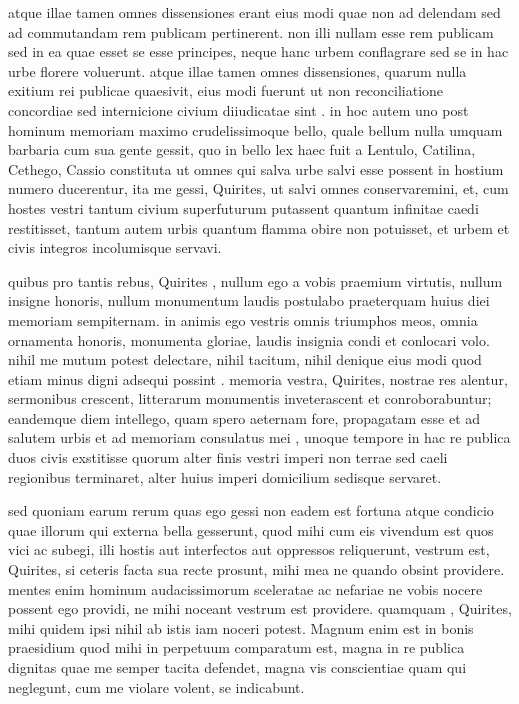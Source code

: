  atque illae tamen omnes dissensiones erant eius modi quae non ad delendam sed ad commutandam rem publicam pertinerent. non illi nullam esse rem publicam sed in ea quae esset se esse principes, neque hanc urbem conflagrare sed se in hac urbe florere voluerunt. atque illae tamen omnes dissensiones, quarum nulla exitium rei publicae quaesivit, eius modi fuerunt ut non reconciliatione concordiae sed internicione civium diiudicatae sint . in hoc autem uno post hominum memoriam maximo crudelissimoque bello, quale bellum nulla umquam barbaria cum sua gente gessit, quo in bello lex haec fuit a Lentulo, Catilina, Cethego, Cassio constituta ut omnes qui salva urbe salvi esse possent in hostium numero ducerentur, ita me gessi, Quirites, ut salvi omnes conservaremini, et, cum hostes vestri tantum civium superfuturum putassent quantum infinitae caedi restitisset, tantum autem urbis quantum flamma obire non potuisset, et urbem et civis integros incolumisque servavi.

 quibus pro tantis rebus, Quirites , nullum ego a vobis praemium virtutis, nullum insigne honoris, nullum monumentum laudis postulabo praeterquam huius diei memoriam sempiternam. in animis ego vestris omnis triumphos meos, omnia ornamenta honoris, monumenta gloriae, laudis insignia condi et conlocari volo. nihil me mutum potest delectare, nihil tacitum, nihil denique eius modi quod etiam minus digni adsequi possint . memoria vestra, Quirites, nostrae res alentur, sermonibus crescent, litterarum monumentis inveterascent et conroborabuntur; eandemque diem intellego, quam spero aeternam fore, propagatam esse et ad salutem urbis et ad memoriam consulatus mei , unoque tempore in hac re publica duos civis exstitisse quorum alter finis vestri imperi non terrae sed caeli regionibus terminaret, alter huius imperi domicilium sedisque servaret.

 sed quoniam earum rerum quas ego gessi non eadem est fortuna atque condicio quae illorum qui externa bella gesserunt, quod mihi cum eis vivendum est quos vici ac subegi, illi hostis aut interfectos aut oppressos reliquerunt, vestrum est, Quirites, si ceteris facta sua recte prosunt, mihi mea ne quando obsint providere. mentes enim hominum audacissimorum sceleratae ac nefariae ne vobis nocere possent ego providi, ne mihi noceant vestrum est providere. quamquam , Quirites, mihi quidem ipsi nihil ab istis iam noceri potest. Magnum enim est in bonis praesidium quod mihi in perpetuum comparatum est, magna in re publica dignitas quae me semper tacita defendet, magna vis conscientiae quam qui neglegunt, cum me violare volent, se indicabunt.

